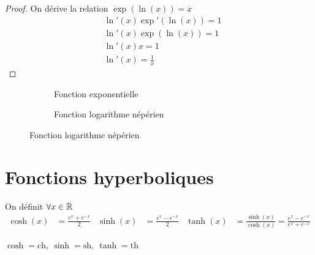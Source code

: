 \begin{proof}
	On dérive la relation $\exp(\ln(x)) = x$
	\begin{align*}
		&\ln'(x) \exp'(\ln(x)) = 1 \\
		&\ln'(x) \exp(\ln(x)) = 1 \\
		&\ln'(x) x = 1 \\
		&\ln'(x) = \frac{1}{x}
	\end{align*}
\end{proof}

\begin{figure}[!h]
	\centering
	\begin{subfigure}{0.45\textwidth}
		\caption{Fonction exponentielle}
	\end{subfigure}
	\begin{subfigure}{0.45\textwidth}
		\caption{Fonction logarithme népérien}
	\end{subfigure}
\end{figure}

\section{Fonctions hyperboliques}
\begin{graybox}
	\begin{definition}
		On définit $\forall x \in \mathbb{R}$ 
		\begin{align*}
			\cosh(x) &= \frac{e^x + e^{-x}}{2} & \sinh(x) &= \frac{e^x - e^{-x}}{2} & \tanh(x) &= \frac{\sinh(x)}{\cosh(x)} = \frac{e^x - e^{-x}}{e^x + e^{-x}}
		\end{align*}
	\end{definition}
\end{graybox}

\begin{remarque}
	$\cosh = \mathrm{ch},\ \sinh = \mathrm{sh},\ \tanh = \mathrm{th}$
\end{remarque}

